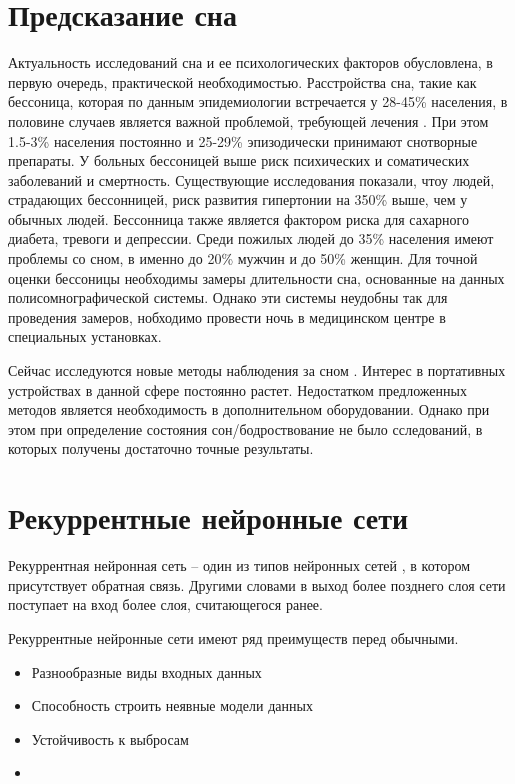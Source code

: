 \section{Предсказание сна}
Актуальность исследований сна и ее психологических факторов обусловлена, в первую очередь, практической необходимостью. 
Расстройства сна, такие как бессоница, которая по данным эпидемиологии встречается у 28-45\% населения, в половине случаев является важной проблемой, требующей лечения \cite{sleep3}.
При этом 1.5-3\% населения постоянно и 25-29\% эпизодически принимают снотворные препараты. 
У больных бессоницей выше риск психических и соматических заболеваний и смертность. Существующие исследования показали, чтоу людей, страдающих бессонницей, риск развития гипертонии на 350\% выше, чем у обычных людей. 
Бессонница также является фактором риска для сахарного диабета, тревоги и депрессии.
Среди пожилых людей до 35\% населения имеют проблемы со сном, в именно до 20\% мужчин и до 50\% женщин. \cite {sleep1, sleep2}
Для точной оценки бессоницы необходимы замеры длительности сна, основанные на данных полисомнографической системы. 
Однако эти системы неудобны так для проведения замеров, нобходимо провести ночь в медицинском центре в специальных установках.

Сейчас исследуются новые методы наблюдения за сном \cite{monitor_sleep, monitor_sleep2, monitor_sleep3}. Интерес в портативных устройствах в данной сфере постоянно растет.
Недостатком предложенных методов является необходимость в дополнительном оборудовании. Однако при этом при определение состояния сон/бодроствование не было  сследований, в которых получены достаточно точные результаты.
\section{Рекуррентные нейронные сети}
Рекуррентная нейронная сеть – один из типов нейронных сетей \cite{neural_network}, в котором присутствует обратная связь. Другими словами в выход более позднего слоя сети поступает на вход более слоя, считающегося ранее.

Рекуррентные нейронные сети имеют ряд преимуществ перед обычными.
\begin{itemize}
	\item Разнообразные виды входных данных
	\item Способность строить неявные модели данных
	\item Устойчивость к выбросам
	\item 
\end{itemize}

